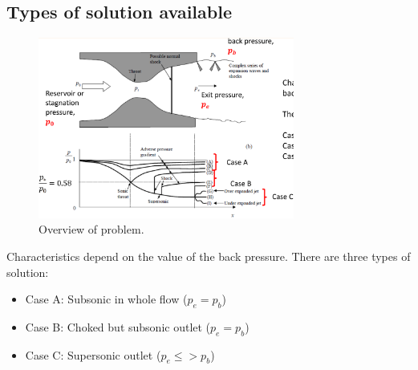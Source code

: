 \documentclass[class=report, crop=false, 12pt,a4paper]{standalone}
\begin{document}
\subsection{Types of solution available}
\begin{figure}[H]
    \centering
    \includegraphics[width = 0.75\textwidth]{../img/diagram56.png}
    \caption{Overview of problem.}
\end{figure}
Characteristics depend on the value of the back pressure. There are three types of solution:
\begin{itemize}
    \item Case A: Subsonic in whole flow ($p_e = p_b$)
    \item Case B: Choked but subsonic outlet ($p_e = p_b$)
    \item Case C: Supersonic outlet ($p_e \leq > p_b$)
\end{itemize}
\end{document}
